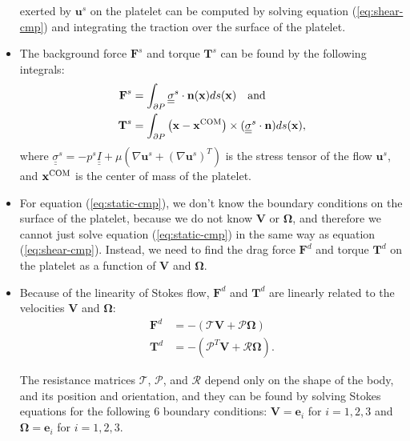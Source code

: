 \documentclass{article}
\newcommand{\tn}{\textnormal}
\newcommand{\vect}[1]{\boldsymbol{\mathbf{#1}}}
\newcommand{\mat}[1]{\underline{\underline{#1}}}
\begin{document}
\begin{itemize}
  exerted by $\vect{u}^s$ on the platelet can be computed by solving
  equation (\ref{eq:shear-cmp}) and integrating the traction over the
  surface of the platelet.
\item The background force $\vect{F}^s$ and torque $\vect{T}^s$ can be
  found by the following integrals:
  \begin{align}
    \vect{F}^s &= \int_{\partial P} \mat{\sigma}^s \cdot
                 \vect{n}(\vect{x}) ds(\vect{x}) \quad
                 \tn{and} \label{eq:force-int} \\
    \vect{T}^s &= \int_{\partial P} \left(\vect{x} -
                 \vect{x}^\tn{COM}\right) \times (\mat{\sigma}^s \cdot
                 \vect{n}) ds(\vect{x}), \label{eq:torque-int}
  \end{align}
  where
  $\mat{\sigma}^s = -p^s \mat{I} + \mu \left(\nabla \vect{u}^s +
    (\nabla \vect{u}^s)^T\right)$ is the stress tensor of the flow
  $\vect{u}^s$, and $\vect{x}^\tn{COM}$ is the center of mass of the
  platelet.
\item For equation (\ref{eq:static-cmp}), we don't know the boundary
  conditions on the surface of the platelet, because we do not know
  $\vect{V}$ or $\vect{\Omega}$, and therefore we cannot just solve
  equation (\ref{eq:static-cmp}) in the same way as equation
  (\ref{eq:shear-cmp}). Instead, we need to find the drag force
  $\vect{F}^d$ and torque $\vect{T}^d$ on the platelet as a function
  of $\vect{V}$ and $\vect{\Omega}$. 
\item Because of the linearity of Stokes flow, $\vect{F}^d$ and
  $\vect{T}^d$ are linearly related to the velocities $\vect{V}$ and
  $\vect{\Omega}$: 
  \begin{align}
    \vect{F}^d &= -(\mathcal{T} \vect{V} + \mathcal{P}
                 \vect{\Omega}) \label{eq:res1} \\
    \vect{T}^d &= -(\mathcal{P}^T \vect{V} + \mathcal{R}
                 \vect{\Omega}). \label{eq:res2}
  \end{align}

  The resistance matrices $\mathcal{T}$, $\mathcal{P}$, and
  $\mathcal{R}$ depend only on the shape of the body, and its position
  and orientation, and they can be found by solving Stokes equations
  for the following 6 boundary conditions: $\vect{V} =
  \vect{e}_i$ for $i = 1, 2, 3$ and $\vect{\Omega} =
  \vect{e}_i$ for $i = 1, 2, 3$.


\end{itemize}
\end{document}
